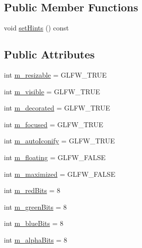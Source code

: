 \subsection*{Public Member Functions}
\begin{DoxyCompactItemize}
\item 
void \mbox{\hyperlink{structec_1_1_window_creation_hints_ae62c9820ab420fb7ada244293c6ffa27}{set\+Hints}} () const
\end{DoxyCompactItemize}
\subsection*{Public Attributes}
\begin{DoxyCompactItemize}
\item 
int \mbox{\hyperlink{structec_1_1_window_creation_hints_a47312559cec4d56ee01b148d5b3cb711}{m\+\_\+resizable}} = G\+L\+F\+W\+\_\+\+T\+R\+UE
\item 
int \mbox{\hyperlink{structec_1_1_window_creation_hints_ab32e332ec3126d619bbd920ee3842b3f}{m\+\_\+visible}} = G\+L\+F\+W\+\_\+\+T\+R\+UE
\item 
int \mbox{\hyperlink{structec_1_1_window_creation_hints_accce8644252e46fd8d6da159b4c2b78c}{m\+\_\+decorated}} = G\+L\+F\+W\+\_\+\+T\+R\+UE
\item 
int \mbox{\hyperlink{structec_1_1_window_creation_hints_a1bb5680092c537626277de7626c08054}{m\+\_\+focused}} = G\+L\+F\+W\+\_\+\+T\+R\+UE
\item 
int \mbox{\hyperlink{structec_1_1_window_creation_hints_adc4b7c26f61f184dd1c3d5ccdca11f0e}{m\+\_\+auto\+Iconify}} = G\+L\+F\+W\+\_\+\+T\+R\+UE
\item 
int \mbox{\hyperlink{structec_1_1_window_creation_hints_afc11b8ea383b4485e594b90170c91475}{m\+\_\+floating}} = G\+L\+F\+W\+\_\+\+F\+A\+L\+SE
\item 
int \mbox{\hyperlink{structec_1_1_window_creation_hints_ab77d85ca54cdf41d3302982630a34d8d}{m\+\_\+maximized}} = G\+L\+F\+W\+\_\+\+F\+A\+L\+SE
\item 
int \mbox{\hyperlink{structec_1_1_window_creation_hints_a038736ff6382e06c07127595970bfaf1}{m\+\_\+red\+Bits}} = 8
\item 
int \mbox{\hyperlink{structec_1_1_window_creation_hints_a05c4a63ab5c715c61de6eeca97d8c3eb}{m\+\_\+green\+Bits}} = 8
\item 
int \mbox{\hyperlink{structec_1_1_window_creation_hints_a3bb9c950dbff85c314cc6a9e71dad56f}{m\+\_\+blue\+Bits}} = 8
\item 
int \mbox{\hyperlink{structec_1_1_window_creation_hints_a51ab0d52ddc09d1e05166a8cb72e15e1}{m\+\_\+alpha\+Bits}} = 8

\end{DoxyCompactItemize}
